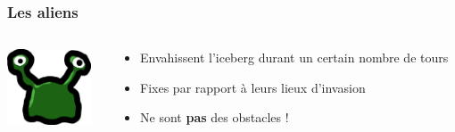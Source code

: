 \documentclass{beamer}
\begin{document}
\begin{frame}
    \frametitle{Les aliens}
    \begin{columns}[T]
        \begin{column}{.2\textwidth}
            \includegraphics[width=2.5cm]{../img/alien_big}
        \end{column}
        \begin{column}{.8\textwidth}
            \begin{itemize}
                \item Envahissent l'iceberg durant un certain nombre de tours
                \item Fixes par rapport à leurs lieux d'invasion
                \item Ne sont \textbf{pas} des obstacles !
            \end{itemize}
        \end{column}
    \end{columns}
\end{frame}
\end{document}
